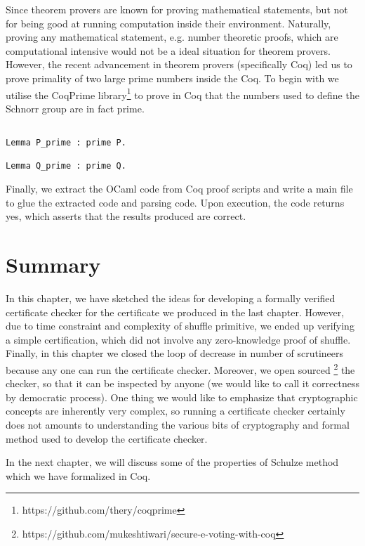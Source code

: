 Since theorem provers are known for proving mathematical statements, but not for being good at running 
computation inside their environment. Naturally, proving any mathematical statement, e.g. number 
theoretic proofs, which are computational intensive would not be a ideal situation for theorem provers. 
However, the recent advancement in theorem provers (specifically Coq) led
us to prove primality of two large prime numbers inside the Coq.
To begin with we utilise the CoqPrime
library\footnote{https://github.com/thery/coqprime} to prove in Coq that the
numbers used to define the Schnorr group are
in fact prime.
\begin{verbatim}

Lemma P_prime : prime P.

Lemma Q_prime : prime Q.

\end{verbatim}


Finally, we extract the OCaml code from Coq proof scripts and write a main file to glue the 
extracted code and parsing code. Upon execution, the code returns 
yes, which asserts that the results produced are correct. 


\section{Summary}
\label{sec:summary_software}
In this chapter, we have sketched the ideas for developing a formally verified certificate checker
for the certificate we produced in the last chapter. However, due to time constraint and 
complexity of shuffle primitive, 
we ended up verifying a simple certification, which did not involve any zero-knowledge proof 
of shuffle.  Finally, in this chapter we closed the loop of decrease in number of scrutineers because 
any one can run the certificate checker. Moreover, we open sourced 
\footnote{https://github.com/mukeshtiwari/secure-e-voting-with-coq} the checker, so 
that it can be inspected by anyone (we would like to call it correctness by democratic 
process).  One thing we would like to emphasize that cryptographic concepts are 
inherently very complex, so running a certificate checker certainly does not amounts 
to understanding the various bits of cryptography and formal method used to develop the
certificate checker.

In the next chapter, we will discuss some of the properties of Schulze method which we have 
formalized in Coq. 











































   
   
   
   
   
   